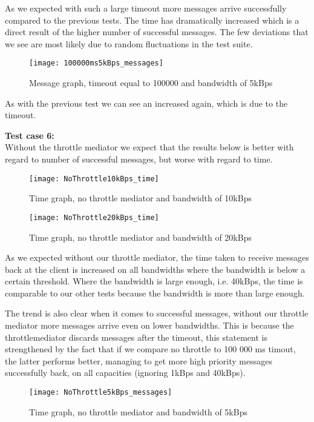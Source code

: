 	As we expected with such a large timeout more messages arrive successfully compared to the previous tests. The time has dramatically increased which is a direct result of the higher number of successful messages. The few deviations that we see are most likely due to random fluctuations in the test suite. 
	
	\begin{figure}[H]
		\centering
		\texttt{[image: 100000ms5kBps\_messages]}
		\caption{Message graph, timeout equal to 100000 and bandwidth of 5kBps} 
		\label{figure:results:100000ms5kBps_messages}
	\end{figure}
	As with the previous test we can see an increased again, which is due to the timeout.
    
    \textbf{Test case 6:}\\
    Without the throttle mediator we expect that the results below is better with regard to number of successful messages, but worse with regard to time.
    \begin{figure}[H]
		\centering
		\texttt{[image: NoThrottle10kBps\_time]}
		\caption{Time graph, no throttle mediator and bandwidth of 10kBps} 
		\label{figure:results:NoThrottle10kBps_time}
	\end{figure}
	
	\begin{figure}[H]
		\centering
		\texttt{[image: NoThrottle20kBps\_time]}
		\caption{Time graph, no throttle mediator and bandwidth of 20kBps} 
		\label{figure:results:NoThrottle20kBps_time}
	\end{figure}
	
	As we expected without our throttle mediator, the time taken to receive messages back at the client is increased on all bandwidths where the bandwidth is below a certain threshold. Where the bandwidth is large enough, i.e. 40kBps, the time is comparable to our other tests because the bandwidth is more than large enough.
	
	The trend is also clear when it comes to successful messages, without our throttle mediator more messages arrive even on lower bandwidths. This is because the throttlemediator discards messages after the timeout, this statement is strengthened by the fact that if we compare no throttle to 100 000 ms timout, the latter performs better, managing to get more high priority messages successfully back, on all capacities (ignoring 1kBps and 40kBps).
	
	\begin{figure}[H]
		\centering
		\texttt{[image: NoThrottle5kBps\_messages]}
		\caption{Time graph, no throttle mediator and bandwidth of 5kBps} 
		\label{figure:results:NoThrottle5kBps_messages}
	\end{figure}\\

